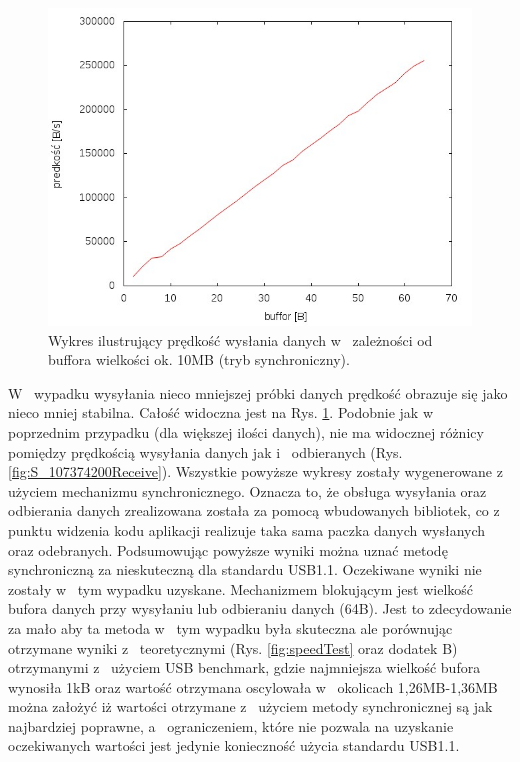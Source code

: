 \documentclass{BscUS}
\begin{document}
\begin{figure}[H]
{
\centering
\includegraphics[width=1\textwidth]{./img/S_10737420Receive}
\caption{Wykres ilustrujący prędkość wysłania danych w~ zależności od buffora wielkości ok. 10MB (tryb synchroniczny).}
\label{fig:S_10737420Receive}
}
\end{figure}
\noindent W~ wypadku wysyłania nieco mniejszej próbki danych prędkość obrazuje się jako nieco mniej stabilna. Całość widoczna jest na Rys. \ref{fig:S_10737420Receive}. Podobnie jak w~ poprzednim przypadku (dla większej ilości danych), nie ma widocznej różnicy pomiędzy prędkością wysyłania danych jak i~ odbieranych (Rys. \ref{fig:S_107374200Receive}).
\newline
\indent Wszystkie powyższe wykresy zostały wygenerowane z~ użyciem mechanizmu synchronicznego. Oznacza to, że obsługa wysyłania oraz odbierania danych zrealizowana została za pomocą wbudowanych bibliotek, co z~ punktu widzenia kodu aplikacji  realizuje taka sama paczka danych wysłanych oraz odebranych. Podsumowując powyższe wyniki można uznać metodę synchroniczną za nieskuteczną dla standardu USB1.1. Oczekiwane wyniki nie zostały w~ tym wypadku uzyskane. Mechanizmem blokującym jest wielkość bufora danych przy wysyłaniu lub odbieraniu danych (64B). Jest to zdecydowanie za mało aby ta metoda w~ tym wypadku była skuteczna ale porównując otrzymane wyniki z~ teoretycznymi (Rys. \ref{fig:speedTest} oraz dodatek B) otrzymanymi z~ użyciem USB benchmark, gdzie najmniejsza wielkość bufora wynosiła 1kB oraz wartość otrzymana oscylowała w~ okolicach 1,26MB-1,36MB można założyć iż wartości otrzymane z~ użyciem metody synchronicznej są jak najbardziej poprawne, a~ ograniczeniem, które nie pozwala na uzyskanie oczekiwanych wartości jest jedynie konieczność użycia standardu USB1.1.
\end{document}
